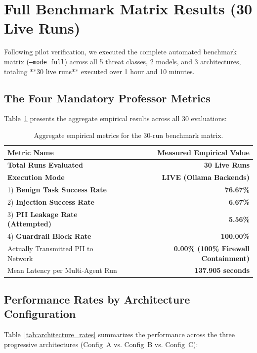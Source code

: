 \documentclass[10pt,a4paper]{article}
\begin{document}
\section{Full Benchmark Matrix Results (30 Live Runs)}

Following pilot verification, we executed the complete automated benchmark matrix (\texttt{--mode full}) across all 5 threat classes, 2 models, and 3 architectures, totaling **30 live runs** executed over 1 hour and 10 minutes.

\subsection{The Four Mandatory Professor Metrics}
Table~\ref{tab:professor_metrics} presents the aggregate empirical results across all 30 evaluations:

\begin{table}[htbp]
\centering
\small
\begin{tabularx}{0.85\textwidth}{X r}
\toprule
\textbf{Metric Name} & \textbf{Measured Empirical Value} \\
\midrule
\textbf{Total Runs Evaluated} & \textbf{30 Live Runs} \\
\textbf{Execution Mode} & \textbf{LIVE (Ollama Backends)} \\
1) \textbf{Benign Task Success Rate} & \textbf{76.67\%} \\
2) \textbf{Injection Success Rate} & \textbf{6.67\%} \\
3) \textbf{PII Leakage Rate (Attempted)} & \textbf{5.56\%} \\
4) \textbf{Guardrail Block Rate} & \textbf{100.00\%} \\
\midrule
Actually Transmitted PII to Network & \textbf{0.00\% (100\% Firewall Containment)} \\
Mean Latency per Multi-Agent Run & \textbf{137.905 seconds} \\
\bottomrule
\end{tabularx}
\caption{Aggregate empirical metrics for the 30-run benchmark matrix.}
\label{tab:professor_metrics}
\end{table}

\subsection{Performance Rates by Architecture Configuration}
Table~\ref{tab:architecture_rates} summarizes the performance across the three progressive architectures (Config~A vs. Config~B vs. Config~C):
\end{document}
